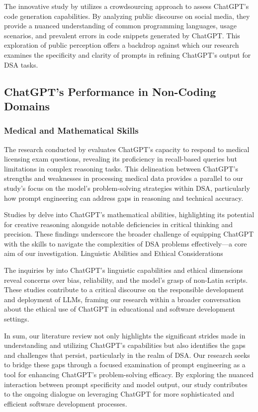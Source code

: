 The innovative study by \cite{10196869} utilizes a crowdsourcing approach to assess ChatGPT's code generation capabilities. By analyzing public discourse on social media, they provide a nuanced understanding of common programming languages, usage scenarios, and prevalent errors in code snippets generated by ChatGPT. This exploration of public perception offers a backdrop against which our research examines the specificity and clarity of prompts in refining ChatGPT's output for DSA tasks.
\subsection{ChatGPT's Performance in Non-Coding Domains}
\subsubsection{Medical and Mathematical Skills}

The research conducted by \cite{info:doi/10.2196/45312} evaluates ChatGPT's capacity to respond to medical licensing exam questions, revealing its proficiency in recall-based queries but limitations in complex reasoning tasks. This delineation between ChatGPT's strengths and weaknesses in processing medical data provides a parallel to our study's focus on the model's problem-solving strategies within DSA, particularly how prompt engineering can address gaps in reasoning and technical accuracy.

Studies by \cite{frieder2023mathematical} delve into ChatGPT's mathematical abilities, highlighting its potential for creative reasoning alongside notable deficiencies in critical thinking and precision. These findings underscore the broader challenge of equipping ChatGPT with the skills to navigate the complexities of DSA problems effectively—a core aim of our investigation.
Linguistic Abilities and Ethical Considerations

The inquiries by \cite{zhuo2023red} into ChatGPT's linguistic capabilities and ethical dimensions reveal concerns over bias, reliability, and the model's grasp of non-Latin scripts. These studies contribute to a critical discourse on the responsible development and deployment of LLMs, framing our research within a broader conversation about the ethical use of ChatGPT in educational and software development settings.

In sum, our literature review not only highlights the significant strides made in understanding and utilizing ChatGPT's capabilities but also identifies the gaps and challenges that persist, particularly in the realm of DSA. Our research seeks to bridge these gaps through a focused examination of prompt engineering as a tool for enhancing ChatGPT's problem-solving efficacy. By exploring the nuanced interaction between prompt specificity and model output, our study contributes to the ongoing dialogue on leveraging ChatGPT for more sophisticated and efficient software development processes.




